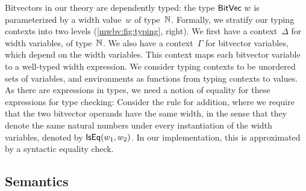 Bitvectors in our theory are dependently typed: the type $\mathsf{BitVec}~{w}$ is
parameterized by a width value~$w$ of type~$\mathbb N$.
%
Formally, we stratify our typing contexts into two levels (\cref{mwbv:fig:typing},
right).
%
We first have a context~$\Delta$ for width variables, of type~$\mathbb N$.
%
We also have a context~$\Gamma$ for bitvector variables, which depend on the
width variables. This context maps each bitvector variable to a well-typed width
expression. We consider typing contexts to be unordered sets of variables, and
environments as functions from typing contexts to values.
As there are expressions in types, we need a notion of equality for these
expressions for type checking:
Consider the rule for addition, where we require that the two bitvector operands
have the same width, in the sense that they denote the same natural numbers
under every instantiation of the width variables, denoted by $\mathsf{IsEq}(w_1, w_2)$.
%
In our implementation, this is approximated by a syntactic equality check.

\subsection{Semantics}
\label{mwbv:sec:semantics}

